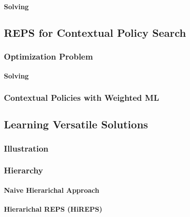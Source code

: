 				\paragraph{Solving} %

		\subsection{REPS for Contextual Policy Search} %

			\subsubsection{Optimization Problem} %

				\paragraph{Solving} %

			\subsubsection{Contextual Policies with Weighted ML} %

		\subsection{Learning Versatile Solutions} %

			\subsubsection{Illustration} %

			\subsubsection{Hierarchy} %

				\paragraph{Naive Hierarichal Approach} %

				\paragraph{Hierarichal REPS (HiREPS)} %

